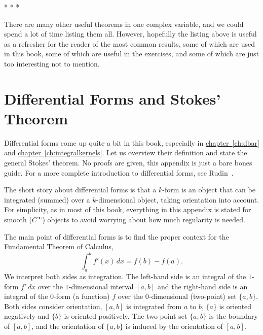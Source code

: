 \documentclass[12pt,openany]{book}
\theoremstyle{plain}
\theoremstyle{remark}
\theoremstyle{definition}
\theoremstyle{exercise}
\theoremstyle{example}
\newcommand{\chapterref}[1]{\hyperref[#1]{chapter~\ref*{#1}}}
\begin{document}
\begin{center}
* * *
\end{center}

There are many other useful theorems in one complex variable, and we could
spend a lot of time listing them all.
However, hopefully the listing above is useful
as a refresher for the reader of the most common results, some of which are
used in this book, some of which are useful in the exercises, and some of
which are just too interesting not to mention.



\chapter{Differential Forms and Stokes' Theorem} \label{ap:diffforms}


Differential forms come up quite a bit in this book, especially
in \chapterref{ch:dbar} and \chapterref{ch:integralkernels}.
Let us overview their definition
and state the general Stokes' theorem.  No proofs are given, this appendix
is just a bare bones guide.
For a more complete introduction to differential forms,
see Rudin~\cite{Rudin:principles}.

The short story about differential forms is that a $k$-form is an object
that can be integrated (summed) over a $k$-dimensional object,
taking orientation into account.
For simplicity, as in most of this book,
everything in this appendix is stated for smooth
($C^\infty$) objects to avoid worrying about how much regularity is needed.

The main point of differential forms is to find the proper context for the
Fundamental Theorem of Calculus,
\begin{equation*}
\int_a^b f'(x) \, dx = f(b)-f(a) .
\end{equation*}
We interpret both sides as integration.  The left-hand side is an integral
of the $1$-form $f'\, dx$ over the $1$-dimensional interval $[a,b]$
and the right-hand side is an integral of the $0$-form (a function)
$f$ over the $0$-dimensional (two-point) set $\{ a, b \}$.  Both sides
consider orientation, $[a,b]$ is integrated from $a$ to $b$,
$\{a\}$ is oriented negatively and
$\{b\}$ is oriented positively.  The two-point set
$\{a,b\}$ is the boundary of $[a,b]$, and the orientation of $\{ a,b \}$
is induced by the orientation of $[a,b]$.
\end{document}
